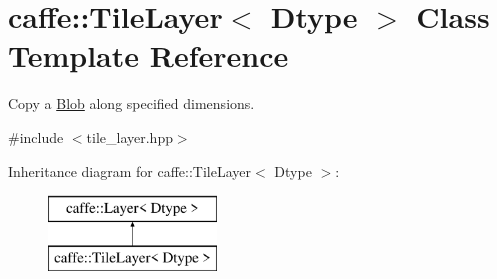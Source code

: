 \hypertarget{classcaffe_1_1TileLayer}{}\section{caffe\+:\+:Tile\+Layer$<$ Dtype $>$ Class Template Reference}
\label{classcaffe_1_1TileLayer}


Copy a \hyperlink{classcaffe_1_1Blob}{Blob} along specified dimensions.  




{\ttfamily \#include $<$tile\+\_\+layer.\+hpp$>$}

Inheritance diagram for caffe\+:\+:Tile\+Layer$<$ Dtype $>$\+:\begin{figure}[H]
\begin{center}
\leavevmode
\includegraphics[height=2.000000cm]{classcaffe_1_1TileLayer}
\end{center}
\end{figure}
